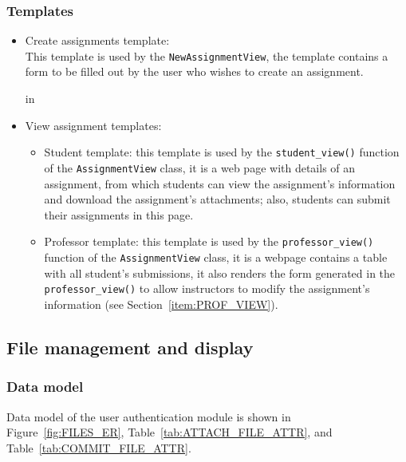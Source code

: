 \subsubsection{Templates}
\begin{itemize}
    \item Create assignments template: \\
    This template is used by the \texttt{NewAssignmentView}, the template
    contains a form to be filled out by the user who wishes to create an
    assignment.

     in

    \item View assignment templates:
    \begin{itemize}
        \item Student template: 
            this template is used by the \texttt{student\_view()} function
            of the \texttt{AssignmentView} class, it is
            a web page with details of an assignment, from
            which students can view the assignment's information and
            download the assignment's attachments; also, students can submit
            their assignments in this page.
        \item Professor template:
            this template is used by the \texttt{professor\_view()} function
            of the \texttt{AssignmentView} class, it is a webpage
            contains a table with all student's submissions, it also renders
            the form generated in the \\ \texttt{professor\_view()} to allow
            instructors to modify the assignment's information
            (see Section~\ref{item:PROF_VIEW}).
    \end{itemize}
\end{itemize}





\subsection{File management and display}

\subsubsection{Data model}
Data model of the user authentication module is shown in
Figure~\ref{fig:FILES_ER}, Table~\ref{tab:ATTACH_FILE_ATTR},
and Table~\ref{tab:COMMIT_FILE_ATTR}. \medskip

